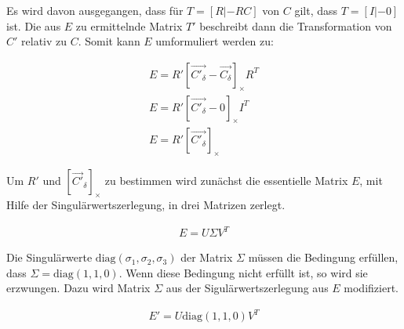 %


Es wird davon ausgegangen, dass für $T = [R|-RC]$ von $C$ gilt, dass $T = [I|-0]$ ist. Die aus $E$ zu ermittelnde Matrix $T'$ beschreibt dann die Transformation von $C'$ relativ zu $C$\cite{HZ,Ferid}. Somit kann $E$ umformuliert werden zu:

\begin{gather}
	E = R'[\vec{C'_\delta} - \vec{C_\delta}]_\times R^T\\
	E = R'[\vec{C'_\delta} - 0]_\times I^T\\
	E = R'[\vec{C'_\delta}]_\times
\end{gather}


Um $R'$ und $[\vec{C'}_\delta]_\times$ zu bestimmen wird zunächst die essentielle Matrix \ensuremath{E}, mit Hilfe der Singulärwertszerlegung, in drei Matrizen zerlegt. 

\begin{gather}
E = U\Sigma V^T
\end{gather}


Die Singulärwerte $\text{diag}(\sigma_1,\sigma_2,\sigma_3)$ der Matrix $\Sigma$ müssen die Bedingung erfüllen, dass $\Sigma = \text{diag}(1,1,0)$\cite{HZ,Ferid}. Wenn diese Bedingung nicht erfüllt ist, so wird sie erzwungen. Dazu wird Matrix $\Sigma$ aus der Sigulärwertszerlegung aus $E$ modifiziert\cite{HZ,Ferid}. 

\begin{gather}
	E' = U\text{diag}(1,1,0)V^T
\end{gather}  



%

